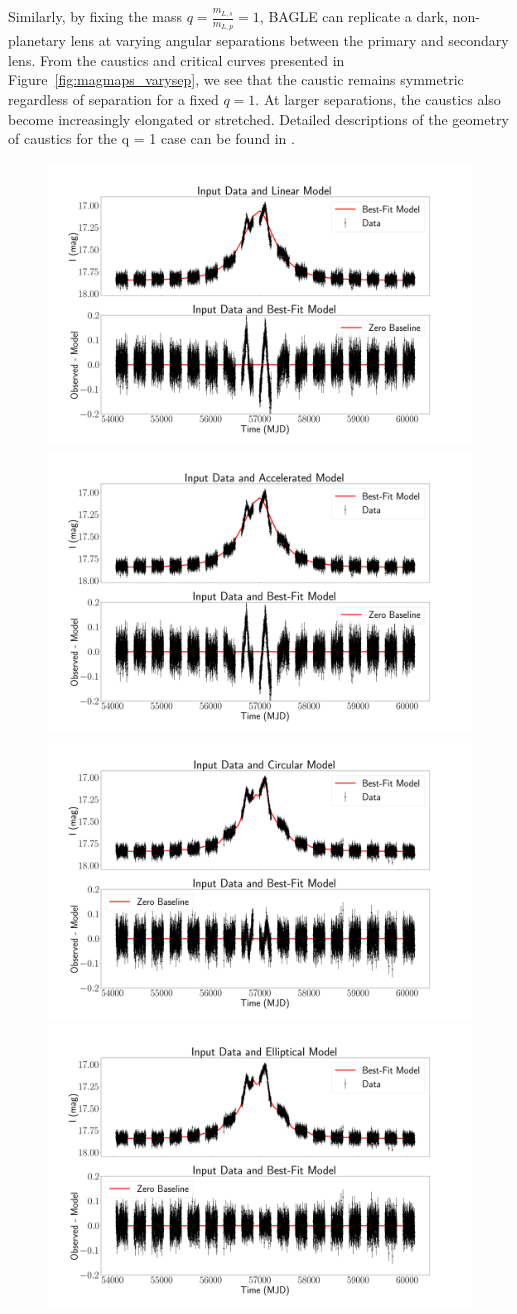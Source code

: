 \documentclass[twocolumn]{aastex701}
\begin{document}
Similarly, by fixing the mass  $q=\frac{m_{L,s}}{m_{L,p}} = 1$, BAGLE can replicate a dark, non-planetary lens at varying angular separations between the primary and secondary lens. From the caustics and critical curves presented in Figure~\ref{fig:magmaps_varysep}, we see that the caustic remains symmetric regardless of separation for a fixed $q=1$. At larger separations, the caustics also become increasingly elongated or stretched. Detailed descriptions of the geometry of caustics for the q = 1 case can be found in \cite{Schneider_1986}.  




\begin{figure}
    \centering
    \includegraphics[width= .48 \textwidth]{figures/LinAnal.png}
    \includegraphics[width= .48 \textwidth]{figures/AccAnal.png}
    \includegraphics[width= .48\textwidth]{figures/CircAnal.png}
    \includegraphics[width= .48\textwidth]{figures/EllAnal.png}


\end{figure}
\end{document}
